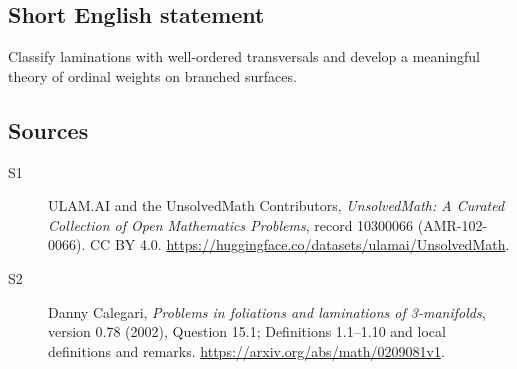 \documentclass[11pt]{article}
\begin{document}
\subsection{Short English statement}
Classify laminations with well-ordered transversals and develop a meaningful theory of ordinal weights on branched surfaces.
\subsection{Sources}
\begin{description}
\item[\hypertarget{source:10300066:1}{S1}] ULAM.AI and the UnsolvedMath Contributors, \emph{UnsolvedMath: A Curated Collection of Open Mathematics Problems}, record 10300066 (AMR-102-0066). CC BY 4.0. \url{https://huggingface.co/datasets/ulamai/UnsolvedMath}.
\item[\hypertarget{source:10300066:2}{S2}] Danny Calegari, \emph{Problems in foliations and laminations of 3-manifolds}, version 0.78 (2002), Question 15.1; Definitions 1.1--1.10 and local definitions and remarks. \url{https://arxiv.org/abs/math/0209081v1}.
\end{description}
\label{end:10300066}
\end{document}
